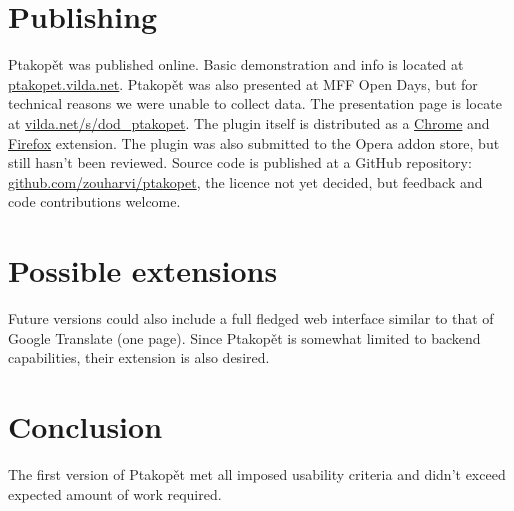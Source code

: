 \documentclass[a4paper]{article}
\begin{document}
\section*{Publishing}
Ptakopět was published online. Basic demonstration and info is located at \href{http://ptakopet.vilda.net}{ptakopet.vilda.net}. Ptakopět was also presented at MFF Open Days, but for technical reasons we were unable to collect data. The presentation page is locate at \href{https://vilda.net/s/dod\_ptakopet}{vilda.net/s/dod\_ptakopet}. The plugin itself is distributed as a \href{https://chrome.google.com/webstore/detail/ptakop\%C4\%9Bt/hgjlgmhmcmcmjiclegnipnaeejpibjmn}{Chrome} and \href{https://addons.mozilla.org/en-US/firefox/addon/ptakop\%C4\%9Bt/}{Firefox} extension. The plugin was also submitted to the Opera addon store, but still hasn't been reviewed.
Source code is published at a GitHub repository: \href{https://github.com/zouharvi/ptakopet}{github.com/zouharvi/ptakopet}, the licence not yet decided, but feedback and code contributions welcome.

\section*{Possible extensions}
Future versions could also include a full fledged web interface similar to that of Google Translate (one page). Since Ptakopět is somewhat limited to backend capabilities, their extension is also desired.

\section*{Conclusion}
The first version of Ptakopět met all imposed usability criteria and didn't exceed expected amount of work required. 
\end{document}
